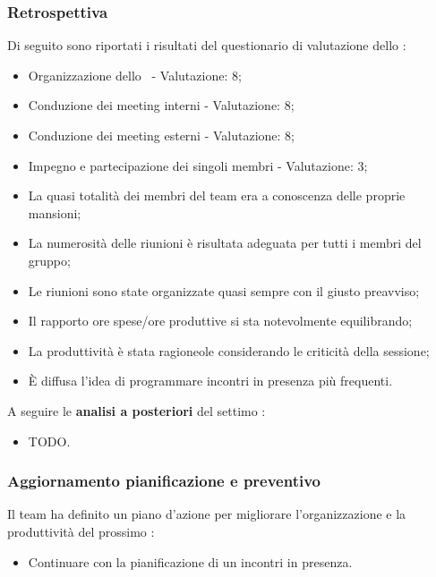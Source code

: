 \subsubsection{Retrospettiva}

\par Di seguito sono riportati i risultati del questionario di valutazione dello :
\begin{itemize}
  \item Organizzazione dello \ - Valutazione: 8;
  \item Conduzione dei meeting interni - Valutazione: 8;
  \item Conduzione dei meeting esterni - Valutazione: 8;
  \item Impegno e partecipazione dei singoli membri - Valutazione: 3;
  \item La quasi totalità dei membri del team era a conoscenza delle proprie mansioni;
  \item La numerosità delle riunioni è risultata adeguata per tutti i membri del gruppo;
  \item Le riunioni sono state organizzate quasi sempre con il giusto preavviso;
  \item Il rapporto ore spese/ore produttive si sta notevolmente equilibrando;
  \item La produttività è stata ragioneole considerando le criticità della sessione;
  \item È diffusa l'idea di programmare incontri in presenza più frequenti.
\end{itemize}

\vspace{0.5\baselineskip}
\par A seguire le \textbf{analisi a posteriori} del settimo :
\begin{itemize}
  \item TODO.
\end{itemize}

\subsubsection{Aggiornamento pianificazione e preventivo}
\par Il team ha definito un piano d'azione per migliorare l'organizzazione e la produttività del prossimo :
\begin{itemize}
  \item Continuare con la pianificazione di un incontri in presenza.
\end{itemize}

